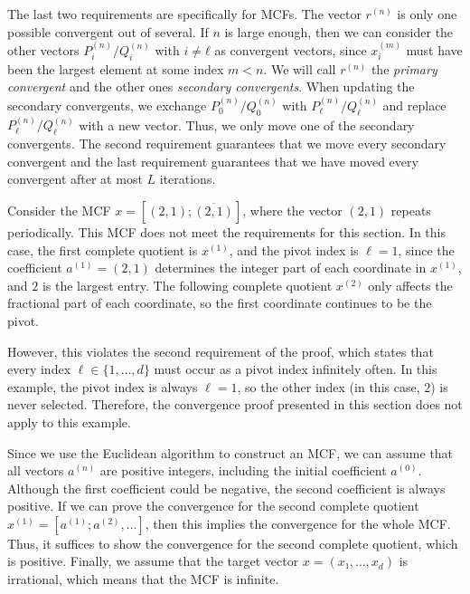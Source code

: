 The last two requirements are specifically for MCFs.
The vector $r^{(n)}$ is only one possible convergent out of several.
If $n$ is large enough, then we can consider the other vectors
$P_i^{(n)}/Q_i^{(n)}$ with $i ≠ ℓ$ as convergent vectors,
since $x_i^{(m)}$ must have been the largest element at some index $m < n$.
We will call $r^{(n)}$ the \emph{primary convergent} and the other ones
\emph{secondary convergents}.
When updating the secondary convergents,
we exchange $P_0^{(n)} / Q_0^{(n)}$ with $P_ℓ^{(n)}/Q_ℓ^{(n)}$
and replace  $P_ℓ^{(n)}/Q_ℓ^{(n)}$ with a new vector.
Thus, we only move one of the secondary convergents.
The second requirement guarantees that we move every secondary convergent
and the last requirement guarantees that we have moved every convergent after at most $L$ iterations.

\begin{example}
  Consider the MCF $x = [(2, 1); \overline{(2, 1)}]$,
  where the vector $(2, 1)$ repeats periodically.
  This MCF does not meet the requirements for this section.
  In this case, the first complete quotient is $x^{(1)}$, and the pivot index is $\ell = 1$,
  since the coefficient $a^{(1)} = (2, 1)$ determines the integer part
  of each coordinate in $x^{(1)}$, and $2$ is the largest entry.
  The following complete quotient $x^{(2)}$ only affects the fractional part
  of each coordinate, so the first coordinate continues to be the pivot.

  However, this violates the second requirement of the proof,
  which states that every index $\ell \in \{1, \dots, d\}$ must occur
  as a pivot index infinitely often.
  In this example, the pivot index is always $\ell = 1$,
  so the other index (in this case, $2$) is never selected.
  Therefore, the convergence proof presented in this section does not apply to this example.
\end{example}

Since we use the Euclidean algorithm to construct an MCF,
we can assume that all vectors $a^{(n)}$ are positive integers,
including the initial coefficient $a^{(0)}$.
Although the first coefficient could be negative,
the second coefficient is always positive.
If we can prove the convergence for the second complete quotient $x^{(1)} = [a^{(1)}; a^{(2)}, …]$,
then this implies the convergence for the whole MCF.
Thus, it suffices to show the convergence for the second complete quotient,
which is positive.
Finally, we assume that the target vector $x = (x₁, …, x_d)$ is irrational,
which means that the MCF is infinite.

